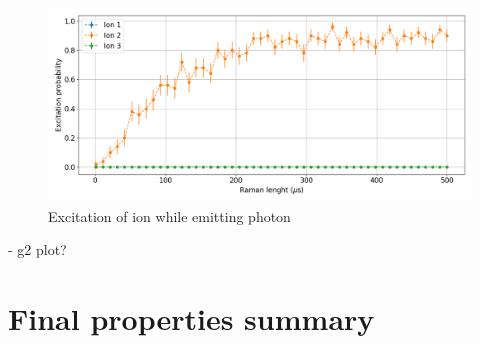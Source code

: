 \begin{figure}[H]
\centering
\includegraphics[width=\textwidth]{img/ramanlength_witherrors}
\caption{Excitation of ion while emitting photon}
\end{figure}

- g2 plot?
\section{Final properties summary}
